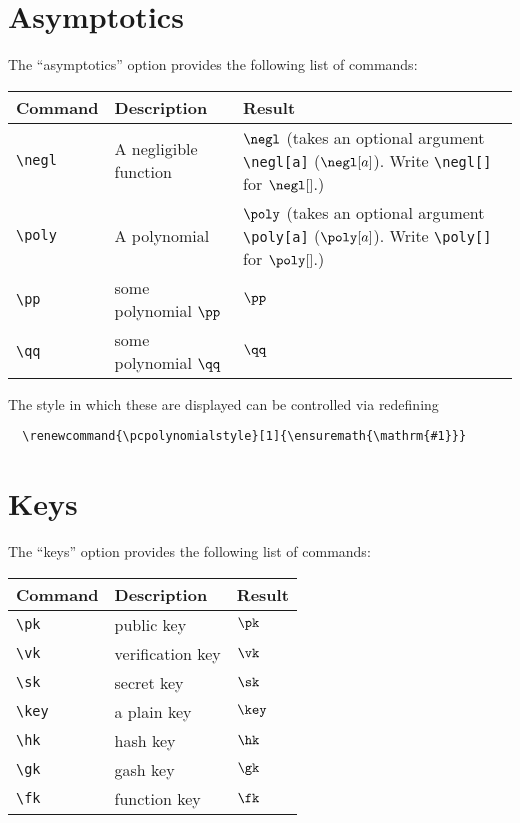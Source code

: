 \documentclass[a4paper]{report}
\begin{document}
  \section{Asymptotics}
  The \enquote{asymptotics} option provides the following list of commands:
  
  \begin{center}
  \begin{tabular}{l l p{7.5cm}}
  \textbf{Command} & \textbf{Description} & \textbf{Result} \\\hline
  \lstinline$\negl$ & A negligible function & $\negl$ (takes an optional argument \lstinline$\negl[a]$ ($\negl[a]$). Write \lstinline$\negl[]$ for $\negl[]$.)  \\
  \lstinline$\poly$ &  A polynomial & $\poly$ (takes an optional argument \lstinline$\poly[a]$ ($\poly[a]$). Write \lstinline$\poly[]$ for $\poly[]$.) \\
  \lstinline$\pp$ & some polynomial $\pp$ & $\pp$  \\
  \lstinline$\qq$ & some polynomial $\qq$ &  $\qq$  \\
  \end{tabular}
  \end{center}
  
  The style in which these are displayed can be controlled via redefining
  \begin{lstlisting}
  \renewcommand{\pcpolynomialstyle}[1]{\ensuremath{\mathrm{#1}}}
  \end{lstlisting}
  
  \section{Keys}
  The \enquote{keys} option provides the following list of commands:
  
  
  \begin{center}
  \begin{tabular}{l l l}
  \textbf{Command} & \textbf{Description} & \textbf{Result} \\\hline
  \lstinline$\pk$ &public key & $\pk$  \\
  \lstinline$\vk$ &  verification key& $\vk$  \\
  \lstinline$\sk$ & secret key&  $\sk$  \\
  \lstinline$\key$ & a plain key& $\key$  \\
  \lstinline$\hk$ & hash key&  $\hk$  \\
  \lstinline$\gk$ &gash key & $\gk$  \\
  \lstinline$\fk$ & function key & $\fk$  
  \end{tabular}
  \end{center}
  
\end{document}
